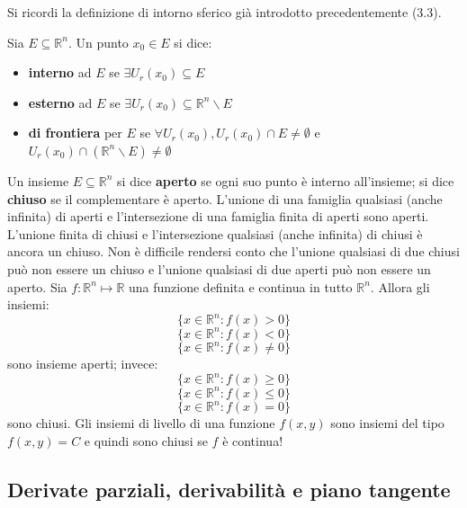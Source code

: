 \documentclass[a4paper]{article}
\numberwithin{equation}{subsection}
\begin{document}
Si ricordi la definizione di intorno sferico già introdotto precedentemente (3.3).
\dfn{}
{
    Sia $E \subseteq \mathbb{R}^n$. Un punto $x_0 \in E$ si dice: 
    \begin{itemize}
        \item \textbf{interno} ad $E$ se $\exists U_r(x_0) \subseteq E$
        \item \textbf{esterno} ad $E$ se $\exists U_r(x_0) \subseteq \mathbb{R}^n \backslash E$
        \item \textbf{di frontiera} per $E$ se $\forall U_r(x_0), U_r(x_0) \cap E \neq \emptyset$ e $U_r(x_0) \cap (\mathbb{R}^n \backslash E) \neq \emptyset$
    \end{itemize} 
}
\dfn{}
{
    Un insieme $E \subseteq \mathbb{R}^n$ si dice \textbf{aperto} se ogni suo punto è interno all'insieme;
    si dice \textbf{chiuso} se il complementare è aperto. 
}
\noindent
L'unione di una famiglia qualsiasi (anche infinita) di aperti e l'intersezione di una famiglia finita di aperti sono aperti.
L'unione finita di chiusi e l'intersezione qualsiasi (anche infinita) di chiusi è ancora un chiuso.
Non è difficile rendersi conto che l'unione qualsiasi di due chiusi può non essere un chiuso e l'unione qualsiasi di due aperti può non essere un aperto.
Sia $f : \mathbb{R}^n \mapsto \mathbb{R}$ una funzione definita e continua in tutto $\mathbb{R}^n$. Allora gli insiemi:
\[\{x \in \mathbb{R}^n : f(x) > 0\}\]
\[\{x \in \mathbb{R}^n : f(x) < 0\}\]
\[\{x \in \mathbb{R}^n : f(x) \neq 0\}\]
sono insieme aperti; invece:
\[\{x \in \mathbb{R}^n : f(x) \ge 0\}\]
\[\{x \in \mathbb{R}^n : f(x) \le 0\}\]
\[\{x \in \mathbb{R}^n : f(x) = 0\}\]
sono chiusi.
\ex{}
{
    Gli insiemi di livello di una funzione $f(x,y)$ sono insiemi del tipo $f(x,y) = C$ e quindi sono chiusi se $f$ è continua!
}

\subsection{Derivate parziali, derivabilità e piano tangente}
\end{document}
